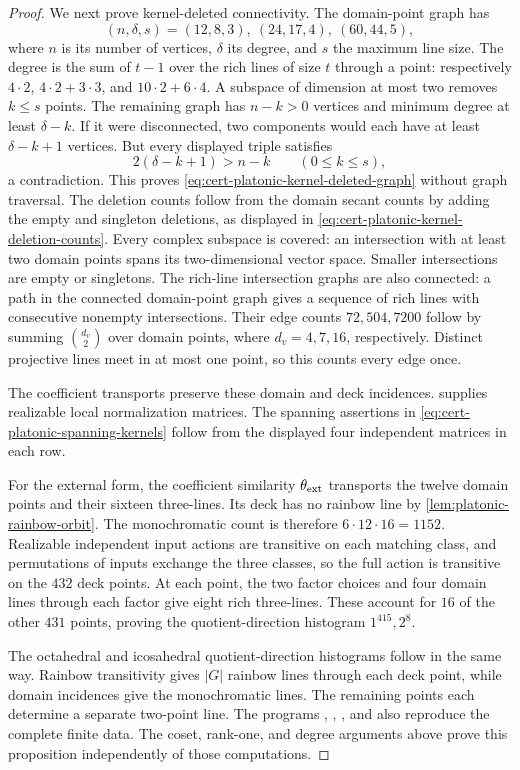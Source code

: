 \documentclass[11pt,letterpaper,onecolumn]{article}
\theoremstyle{plain}
\theoremstyle{definition}
\theoremstyle{remark}
\begin{document}
\begin{proof}
We next prove kernel-deleted connectivity.  The domain-point graph has
\[
 (n,\delta,s)=(12,8,3),\ (24,17,4),\ (60,44,5),
\]
where \(n\) is its number of vertices, \(\delta\) its degree, and \(s\)
the maximum line size.  The degree is the sum of \(t-1\) over the rich
lines of size \(t\) through a point: respectively \(4\cdot2\),
\(4\cdot2+3\cdot3\), and \(10\cdot2+6\cdot4\).
A subspace of dimension at most two removes \(k\le s\) points.  The
remaining graph has \(n-k>0\) vertices and minimum degree at least
\(\delta-k\).  If it were disconnected, two components would each have
at least \(\delta-k+1\) vertices.  But every displayed triple satisfies
\[
 2(\delta-k+1)>n-k\qquad(0\le k\le s),
\]
a contradiction.  This proves \cref{eq:cert-platonic-kernel-deleted-graph}
without graph traversal.  The deletion counts follow from the domain
secant counts by adding the empty and singleton deletions, as displayed
in \cref{eq:cert-platonic-kernel-deletion-counts}.  Every complex
subspace is covered: an intersection with at least two domain points
spans its two-dimensional vector space. Smaller intersections are empty
or singletons.  The rich-line intersection graphs are also connected:
a path in the connected domain-point graph gives a sequence of rich
lines with consecutive nonempty intersections.  Their edge counts
\(72,504,7200\) follow by summing \(\binom{d_v}{2}\) over domain
points, where \(d_v=4,7,16\), respectively.  Distinct projective lines
meet in at most one point, so this counts every edge once.

The coefficient transports preserve these domain and deck incidences.
 supplies realizable local normalization
matrices.  The spanning assertions in
\cref{eq:cert-platonic-spanning-kernels} follow from the displayed four
independent matrices in each row.

For the external form, the coefficient similarity
\(\theta_{\rm ext}\) transports the twelve domain points and their
sixteen three-lines.  Its deck has no rainbow line by
\cref{lem:platonic-rainbow-orbit}.  The monochromatic count is therefore
\(6\cdot12\cdot16=1152\).  Realizable independent input actions are
transitive on each matching class, and permutations of inputs exchange the
three classes, so the full action is transitive on the \(432\) deck
points.  At each point, the two factor choices and four domain lines
through each factor give eight rich three-lines.  These account for
\(16\) of the other \(431\) points, proving the quotient-direction
histogram \(1^{415},2^8\).

The octahedral and icosahedral quotient-direction histograms follow in
the same way.  Rainbow transitivity gives \(|G|\) rainbow lines through
each deck point, while domain incidences give the monochromatic lines.
The remaining points each determine a separate two-point line.
The programs
,
,
, and
 also reproduce the
complete finite data.  The coset, rank-one, and degree arguments above prove this proposition
independently of those computations.
\end{proof}
\end{document}
